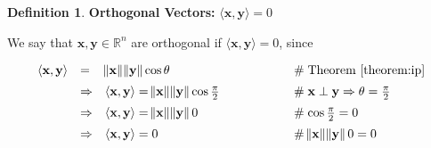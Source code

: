 \documentclass{article}
\theoremstyle{definition}
\newtheorem{definition}{Definition}[section]
\begin{document}
\medskip
\noindent
\begin{definition} {\bf Orthogonal Vectors:} $\langle \mathbf{x}, \mathbf{y} \rangle = 0$

\bigskip
\noindent
We say that $\mathbf{x}, \mathbf{y} \in \mathbb{R}^{n}$ are
orthogonal if $\langle \mathbf{x}, \mathbf{y} \rangle = 0$, since

\begin{equation*}
\begin{array}{lllll}
\langle \mathbf{x}, \mathbf{y} \rangle 
&=& \norm{\mathbf{x}} \norm{\mathbf{y}} \cos \theta
		&\hspace{5em} \mathrel{\#} \text{Theorem \ref{theorem:ip}} \\
[5pt]
&\Rightarrow& \langle \mathbf{x}, \mathbf{y} \rangle 
		= \norm{\mathbf{x}} \norm{\mathbf{y}} \cos \frac{\pi}{2}
		&\hspace{5em} \mathrel{\#} \mathbf{x} \perp\mathbf{y} \Rightarrow 
		\theta = \frac{\pi}{2} \\
[5pt]
&\Rightarrow& \langle \mathbf{x}, \mathbf{y} \rangle 
		= \norm{\mathbf{x}} \norm{\mathbf{y}} 0
		&\hspace{5em} \mathrel{\#} \cos \frac{\pi}{2} = 0 \\
[5pt]
&\Rightarrow & \langle \mathbf{x}, \mathbf{y} \rangle  = 0
		&\hspace{5em} \mathrel{\#} \norm{\mathbf{x}} \norm{\mathbf{y}} 0 = 0
\end{array}
\end{equation*}
\end{definition}
\end{document}
